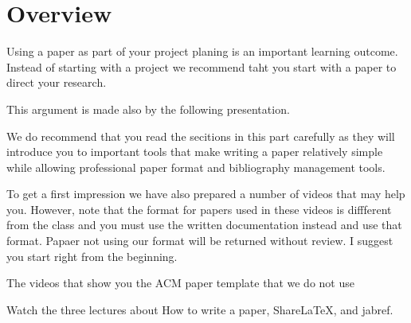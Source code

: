 \section{Overview}\label{C:overview-doc}

\FILENAME

Using a paper as part of your project planing is an important learning
outcome. Instead of starting with a project we recommend taht you
start with a paper to direct your research.

This argument is made also by the following presentation.


We do recommend that you read the secitions in this part carefully as they will introduce you to important tools that make writing a paper relatively simple while allowing professional paper format and bibliography management tools.

To get a first impression we have also prepared a number of videos that may help you. However, note that the format for papers used in these videos is diffferent from the class and you must use the written documentation instead and use that format. Papaer not using our format will be returned without review. I suggest you start right from the beginning.

\begin{WARNING}
The videos that show you the ACM paper template that we do not use



\end{WARNING}

\begin{exercise}\label{E:Documentation.1}
Watch the three lectures about How to write a paper, ShareLaTeX, and jabref.
\end{exercise}